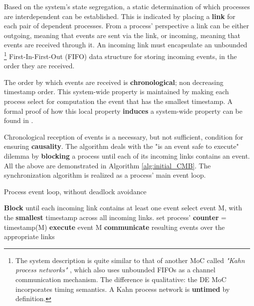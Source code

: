 \documentclass[11pt]{article}
\begin{document}
Based on the system's state segregation, a static determination of which processes are interdependent can be established.
This is indicated by placing a \textbf{link} for each pair of dependent processes.
From a process' perspective a link can be either outgoing, meaning that events are sent via the link, or incoming, meaning that events are received through it.
An incoming link must encapsulate an unbounded \footnote{The system description is quite similar to that of another MoC called \textit{"Kahn process networks"} \cite{Editor2014}, which also uses unbounded FIFOs as a channel communication mechanism.
The difference is qualitative: the DE MoC incorporates timing semantics.
A Kahn process network is \textbf{untimed} by definition.} First-In-First-Out (FIFO) data structure  for storing incoming events, in the order they are received.

The order by which events are received is \textbf{chronological}; non decreasing timestamp order.
This system-wide property is maintained by making each process select for computation the event that has the smallest timestamp.
A formal proof of how this local property \textbf{induces} a system-wide property can be found in \cite{Bryant} \cite{Chandy1979}.

Chronological reception of events is a necessary, but not sufficient, condition for ensuring \textbf{causality}.
The algorithm deals with the "is an event safe to execute" dilemma by \textbf{blocking} a process until each of its incoming links contains an event.
All the above are demonstrated in Algorithm \ref{alg:initial_CMB}. 
The synchronization algorithm is realized as a process' main event loop.

\begin{LATEX}
\begin{algorithm}
\caption{Process event loop, without deadlock avoidance}
\label{alg:initial_CMB}
\begin{algorithmic}[1]

      \State \textbf{Block} until each incoming link contains at least one event
      \State select event M, with the \textbf{smallest} timestamp across all incoming links.
      \State set process' \textbf{counter} = timestamp(M)
      \State \textbf{execute} event M
      \State \textbf{communicate} resulting events over the appropriate links
   \EndWhile

\end{algorithmic}
\end{algorithm}
\end{LATEX}
\end{document}
